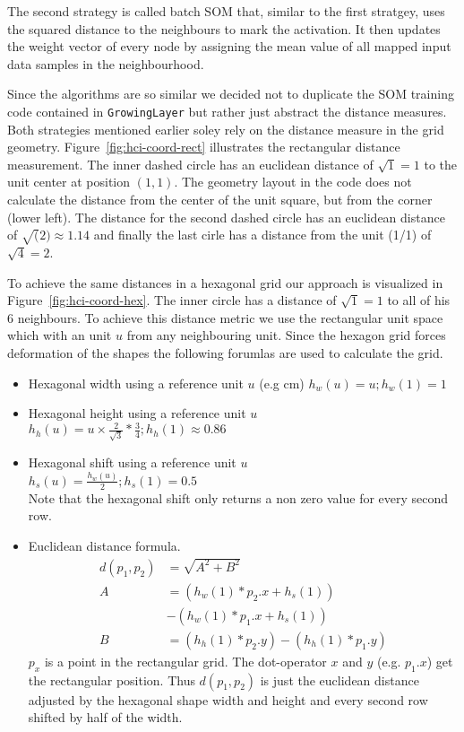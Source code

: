 \documentclass{acm_proc_article-sp}
\begin{document}
The second strategy is called batch SOM that, similar to the first stratgey, uses the squared distance to the neighbours
to mark the activation. It then updates the weight vector of every node by assigning the mean value of all mapped input
data samples in the neighbourhood.

Since the algorithms are so similar we decided not to duplicate the SOM training code contained in \lstinline!GrowingLayer! but
rather just abstract the distance measures. Both strategies mentioned earlier soley rely on the distance measure in the grid geometry.
Figure~\ref{fig:hci-coord-rect} illustrates the rectangular distance measurement.
The inner dashed circle has an euclidean distance of $\sqrt{1} = 1$ to
the unit center at position $(1,1)$. The geometry layout in the code does not calculate the distance from the center of
the unit square, but from the corner (lower left). The distance for the second dashed circle has an euclidean distance of $\sqrt(2) \approx 1.14$ and finally the last cirle has a distance from the unit (1/1) of $\sqrt{4} = 2$.

To achieve the same distances in a hexagonal grid our approach is visualized in Figure~\ref{fig:hci-coord-hex}.
The inner circle has a distance of $\sqrt{1} = 1$ to all of his 6 neighbours. To achieve this distance metric 
we use the rectangular unit space which with an unit $u$ from any neighbouring unit. Since the hexagon grid forces deformation
of the shapes the following forumlas are used to calculate the grid.

\begin{itemize}
    \item Hexagonal width using a reference unit $u$ (e.g cm)
        $ h_w(u) = u; h_w(1) = 1 $
    \item Hexagonal height using a reference unit $u$ \\
        $ h_h(u) = u \times \frac{2}{\sqrt{3}} * \frac{3}{4}; h_h(1) \approx 0.86 $
    \item Hexagonal shift using a reference unit $u$ \\
        $ h_s(u) = \frac{h_w(u)}{2}; h_s(1) = 0.5 $ \\
        Note that the hexagonal shift only returns a non zero
        value for every second row.
    \item Euclidean distance formula. 
    \begin{align*}
        d(p_1,p_2) & = \sqrt{ A^2 + B^2 }\\
        A & = (h_w(1) * p_2.x + h_s(1)) \\
          &- (h_w(1) * p_1.x + h_s(1))\\
        B & = (h_h(1) * p_2.y) - (h_h(1) * p_1.y)
    \end{align*}
    $p_x$ is a point in the rectangular grid. The dot-operator $x$ and $y$
    (e.g. $p_1.x$) get the rectangular position. Thus $d(p_1,p_2)$ is just the
    euclidean distance adjusted by the hexagonal shape width and height
    and every second row shifted by half of the width.
\end{itemize}
\end{document}
